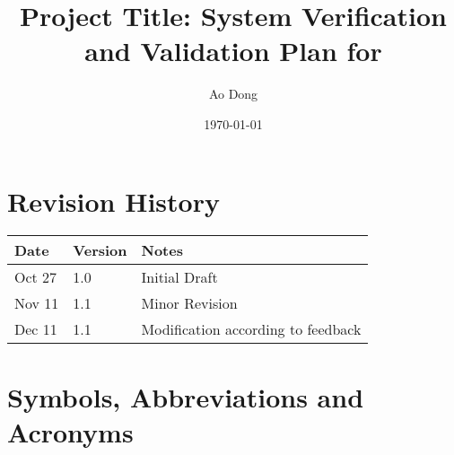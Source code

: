 \documentclass[12pt, titlepage]{article}
\begin{document}
\title{Project Title: System Verification and Validation Plan for \progname{}} 
\author{Ao Dong}
\date{\today}
	
\maketitle


\section{Revision History}

\begin{tabularx}{\textwidth}{p{3cm}p{2cm}X}
\toprule {\bf Date} & {\bf Version} & {\bf Notes}\\
\midrule
Oct 27 & 1.0 & Initial Draft\\
Nov 11 & 1.1 & Minor Revision\\
Dec 11 & 1.1 & Modification according to feedback\\
\bottomrule
\end{tabularx}

\newpage

\tableofcontents

\listoftables

\listoffigures

\newpage

\section{Symbols, Abbreviations and Acronyms}
\end{document}
